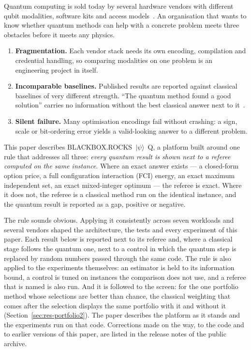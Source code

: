 \documentclass[11pt,a4paper]{article}
\newcommand{\sysname}{BLACKBOX.ROCKS~$|\psi\rangle$~Q}
\begin{document}
Quantum computing is sold today by several hardware vendors with different
qubit modalities, software kits and access models~\cite{preskill2018,bharti2022}.
An organisation that wants to know whether quantum methods can help with a
concrete problem meets three obstacles before it meets any physics.

\begin{enumerate}
  \item \textbf{Fragmentation.} Each vendor stack needs its own encoding,
        compilation and credential handling, so comparing modalities on one
        problem is an engineering project in itself.
  \item \textbf{Incomparable baselines.} Published results are reported
        against classical baselines of very different strength. ``The quantum
        method found a good solution'' carries no information without the
        best classical answer next to it~\cite{ronnow2014,abbas2024}.
  \item \textbf{Silent failure.} Many optimisation encodings fail without
        crashing: a sign, scale or bit-ordering error yields a valid-looking
        answer to a different problem.
\end{enumerate}

This paper describes \sysname{}, a platform built around one rule that
addresses all three: \emph{every quantum result is shown next to a referee
computed on the same instance}. Where an exact answer exists --- a closed-form
option price, a full configuration interaction (FCI) energy, an exact maximum
independent set, an exact mixed-integer optimum --- the referee is exact.
Where it does not, the referee is a classical method run on the identical
instance, and the quantum result is reported as a gap, positive or negative.

The rule sounds obvious. Applying it consistently across seven workloads and
several vendors shaped the architecture, the tests and every experiment of
this paper. Each result below is reported next to its referee and, where a
classical stage follows the quantum one, next to a control in which the
quantum step is replaced by random numbers passed through the same code. The
rule is also applied to the experiments themselves: an estimator is held to
its information bound, a control is tuned on instances the comparison does
not use, and a referee that is named is also run. And it is followed to the
screen: for the one portfolio method whose selections are better than
chance, the classical weighting that comes after the selection displays the
same portfolio with it and without it (Section~\ref{sec:res-portfolio2}).
The paper describes the platform as it stands and the experiments run on
that code. Corrections made on the way, to the code and to earlier versions
of this paper, are listed in the release notes of the public archive.
\end{document}
